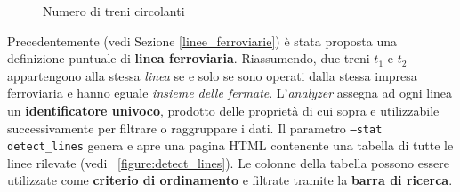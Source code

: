 \documentclass[12pt,italian]{report}
\begin{document}
\begin{figure}[p] \centering
     \vspace{5mm}
    \caption{Numero di treni circolanti}
\end{figure}

Precedentemente (vedi Sezione \ref{linee_ferroviarie}) è stata
proposta una definizione puntuale di \textbf{linea ferroviaria}.
Riassumendo, due treni $t_1$ e $t_2$ appartengono alla stessa
\textit{linea} se e solo se sono operati dalla stessa impresa
ferroviaria e hanno eguale \textit{insieme delle fermate}.
L'\textit{analyzer} assegna ad ogni linea un \textbf{identificatore
    univoco}, prodotto delle proprietà di cui sopra e utilizzabile
successivamente per filtrare o raggruppare i dati.  Il parametro
\texttt{--stat detect\_\-lines} genera e apre una pagina HTML
contenente una tabella di tutte le linee rilevate (vedi
\figurename~\ref{figure:detect_lines}).  Le colonne della tabella
possono essere utilizzate come \textbf{criterio di ordinamento} e
filtrate tramite la \textbf{barra di ricerca}.
\end{document}
